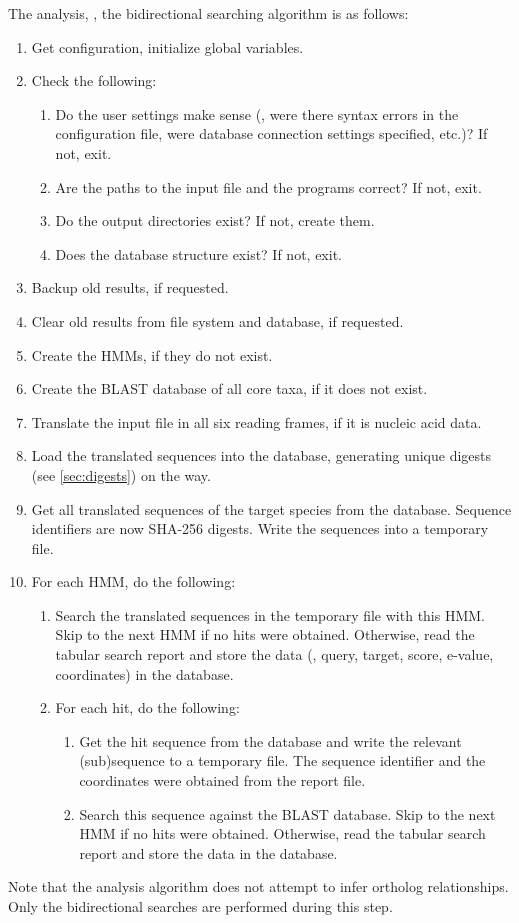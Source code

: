 The analysis, \ie, the bidirectional searching algorithm is as follows:

\begin{enumerate}
	\item Get configuration, initialize global variables.
	\item Check the following:
	\begin{enumerate}
		\item Do the user settings make sense (\eg, were there syntax errors in the
			configuration file, were database connection settings specified, etc.)? If
			not, exit.
		\item Are the paths to the input file and the programs correct? If not,
			exit.
		\item Do the output directories exist? If not, create them.
		\item Does the database structure exist? If not, exit.
	\end{enumerate}
	\item Backup old results, if requested.
	\item Clear old results from file system and database, if requested.
	\item Create the HMMs, if they do not exist.
	\item Create the BLAST database of all core taxa, if it does not exist.
	\item Translate the input file in all six reading frames, if it is nucleic
		acid data.
	\item Load the translated sequences into the database, generating unique
		 digests (see
		\autoref{sec:digests}) on the way.
	\item Get all translated sequences of the target species from the database.
		Sequence identifiers are now SHA-256 digests. Write the sequences into a
		temporary file.
	\item For each HMM, do the following:
	\begin{enumerate}
		\item Search the translated sequences in the temporary file with this HMM.
			Skip to the next HMM if no hits were obtained. Otherwise, read the tabular
			search report and store the data (\eg, query, target, score, e-value,
			coordinates) in the database.
		\item For each hit, do the following:
		\begin{enumerate}
			\item Get the hit sequence from the database and write the relevant
				(sub)sequence to a temporary file. The sequence identifier and the
				coordinates were obtained from the  report file.
			\item Search this sequence against the BLAST database. Skip to the next
				HMM if no hits were obtained. Otherwise, read the tabular search report
				and store the data in the database. 
		\end{enumerate}
	\end{enumerate}
\end{enumerate}

Note that the analysis algorithm does not attempt to infer ortholog
relationships. Only the bidirectional searches are performed during this step. 
